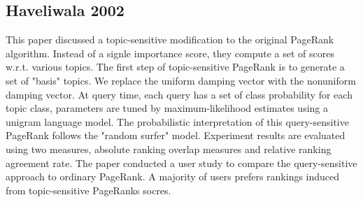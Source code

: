 \documentclass[9pt]{article}
\begin{document}
\subsection{Haveliwala 2002}
This paper discussed a topic-sensitive modification to the original PageRank algorithm. Instead of a signle importance score, they compute a set of scores w.r.t. various topics. The first step of topic-sensitive PageRank is to generate a set of "basis" topics. We replace the uniform damping vector with the nonuniform damping vector. At query time, each query has a set of class probability for each topic class, parameters are tuned by maximum-likelihood estimates using a unigram language model. The probabilistic interpretation of this query-sensitive PageRank follows the "random surfer" model. Experiment results are evaluated using two measures, absolute ranking overlap measures and relative ranking agreement rate. The paper conducted a user study to compare the query-sensitive approach to ordinary PageRank. A majority of users prefers rankings induced from topic-sensitive PageRanks socres. 




\end{document}
